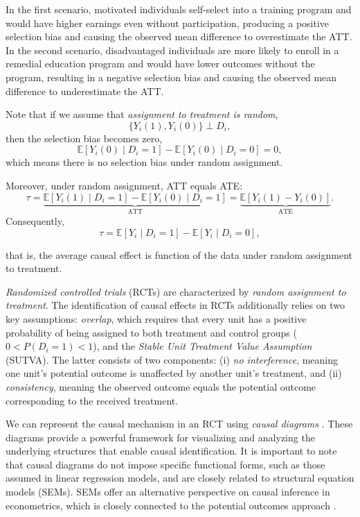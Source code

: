 In the first scenario, motivated individuals self-select into a training program and would have higher earnings even without participation, producing a positive selection bias and causing the observed mean difference to overestimate the ATT. In the second scenario, disadvantaged individuals are more likely to enroll in a remedial education program and would have lower outcomes without the program, resulting in a negative selection bias and causing the observed mean difference to underestimate the ATT.

Note that if we assume that \textit{assignment to treatment is random},
\[
\{ Y_i(1), Y_i(0) \} \perp D_i,
\]
then the selection bias becomes zero,
\[
\mathbb{E}[Y_i(0) \mid D_i = 1] - \mathbb{E}[Y_i(0) \mid D_i = 0] = 0,
\]
which means there is no selection bias under random assignment.

Moreover, under random assignment, ATT equals ATE:
\[
\tau = \underbrace{\mathbb{E}[Y_i(1)\mid D_i=1]-\mathbb{E}[Y_i(0)\mid D_i=1]}_{\text{ATT}} 
= \underbrace{\mathbb{E}[Y_i(1)-Y_i(0)]}_{\text{ATE}}.
\]
Consequently,
\begin{equation}
	\tau=\mathbb{E}[Y_i \mid D_i = 1] - \mathbb{E}[Y_i \mid D_i = 0],
\end{equation}

that is, the average causal effect is function of the data under random assignment to treatment.
 
\textit{Randomized controlled trials} (RCTs) are characterized by \textit{random assignment to treatment}. The identification of causal effects in RCTs additionally relies on two key assumptions: \textit{overlap}, which requires that every unit has a positive probability of being assigned to both treatment and control groups ($0 < P(D_i = 1) < 1$), and the \textit{Stable Unit Treatment Value Assumption} (SUTVA). The latter consists of two components: (i) \textit{no interference}, meaning one unit’s potential outcome is unaffected by another unit’s treatment, and (ii) \textit{consistency}, meaning the observed outcome equals the potential outcome corresponding to the received treatment.

We can represent the causal mechanism in an RCT using \textit{causal diagrams} \cite{pearl1995causal,pearl2018book}. These diagrams provide a powerful framework for visualizing and analyzing the underlying structures that enable causal identification. It is important to note that causal diagrams do not impose specific functional forms, such as those assumed in linear regression models, and are closely related to structural equation models (SEMs). SEMs offer an alternative perspective on causal inference in econometrics, which is closely connected to the potential outcomes approach \cite{haavelmo1943statistical,marschak1944random,imbens2014ivperspective}.

